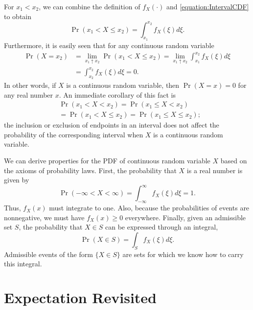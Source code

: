 For $x_1 < x_2$, we can combine the definition of $f_X(\cdot)$ and \eqref{equation:IntervalCDF} to obtain
\begin{equation*}
\Pr (x_1 < X \leq x_2) = \int_{x_1}^{x_2} f_X (\xi) d\xi .
\end{equation*}
Furthermore, it is easily seen that for any continuous random variable
\begin{equation*}
\begin{split}
\Pr (X = x_2) &= \lim_{x_1 \uparrow x_2} \Pr (x_1 < X \leq x_2)
= \lim_{x_1 \uparrow x_2} \int_{x_1}^{x_2} f_X (\xi) d\xi \\
&= \int_{x_2}^{x_2} f_X (\xi) d\xi = 0.
\end{split}
\end{equation*}
In other words, if $X$ is a continuous random variable, then $\Pr (X = x) = 0$ for any real number $x$.
An immediate corollary of this fact is
\begin{equation*}
\begin{split}
&\Pr (x_1 < X < x_2)
= \Pr (x_1 \leq X < x_2) \\
&= \Pr (x_1 < X \leq x_2)
= \Pr (x_1 \leq X \leq x_2) ;
\end{split}
\end{equation*}
the inclusion or exclusion of endpoints in an interval does not affect the probability of the corresponding interval when $X$ is a continuous random variable.

We can derive properties for the PDF of continuous random variable $X$ based on the axioms of probability laws.
First, the probability that $X$ is a real number is given by
\begin{equation*}
\Pr (-\infty < X < \infty) = \int_{-\infty}^{\infty} f_X (\xi) d\xi = 1.
\end{equation*}
Thus, $f_X (x)$ must integrate to one.
Also, because the probabilities of events are nonnegative, we must have $f_X (x) \geq 0$ everywhere.
Finally, given an admissible set $S$, the probability that $X \in S$ can be expressed through an integral,
\begin{equation*}
\Pr (X \in S) = \int_S f_X (\xi) d\xi .
\end{equation*}
Admissible events of the form $\{ X \in S \}$ are sets for which we know how to carry this integral.


\section{Expectation Revisited}

